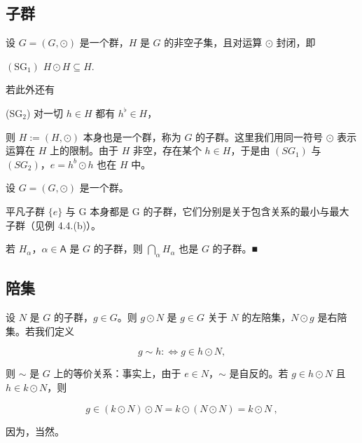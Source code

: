 \subsection*{子群}

设 $ G = (G, \odot) $ 是一个群，$ H $ 是 $ G $ 的非空子集，且对运算 $ \odot $ 封闭，即

$ (\mathrm{SG}_1) $ $ H \odot H \subseteq H $.

若此外还有

(SG$_2$) 对一切 $ h \in H $ 都有 $ h^{\flat} \in H $，

则 $H := (H, \odot)$ 本身也是一个群，称为 $G$ 的子群。这里我们用同一符号 $\odot$ 表示运算在 $H$ 上的限制。由于 $H$ 非空，存在某个 $h \in H$，于是由 $(SG_1)$ 与 $(SG_2)$，$e = h^b \odot h$ 也在 $H$ 中。

\begin{example}

设 $  G = (G, \odot)  $ 是一个群。

\begin{items}
\item

平凡子群 $ \{e\} $ 与 G 本身都是 G 的子群，它们分别是关于包含关系的最小与最大子群（见例 4.4.(b)）。

\item

若 $ H_\alpha $，$ \alpha \in \mathsf{A} $ 是 $ G $ 的子群，则 $ \bigcap_\alpha H_\alpha $ 也是 $ G $ 的子群。■

\end{items}

\end{example}

\subsection*{陪集}

设 $N$ 是 $G$ 的子群，$g \in G$。则 $g \odot N$ 是 $g \in G$ 关于 $N$ 的左陪集，$N \odot g$ 是右陪集。若我们定义

\begin{equation}
g\sim h:\Leftrightarrow g\in h\odot N,
\end{equation}

则 $\sim$ 是 $G$ 上的等价关系：事实上，由于 $e \in N$，$\sim$ 是自反的。若 $g \in h \odot N$ 且 $h \in k \odot N$，则

\[
g\in\left(k\odot N\right)\odot N=k\odot\left(N\odot N\right)=k\odot N~,
\]

因为，当然。

